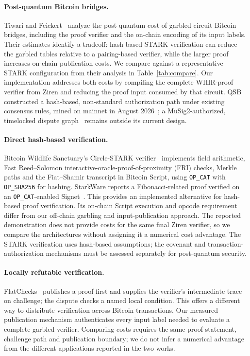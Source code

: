\documentclass[11pt]{article}
\begin{document}
\paragraph{Post-quantum Bitcoin bridges.} Tiwari and Feickert~\cite{tf26pq}
analyze the post-quantum cost of garbled-circuit Bitcoin bridges, including
the proof verifier and the on-chain encoding of its input labels. Their
estimates identify a tradeoff: hash-based STARK verification can reduce the
garbled tables relative to a pairing-based verifier, while the larger
proof increases on-chain publication costs. We compare against a
representative STARK configuration from their analysis in
Table~\ref{tab:compare}. Our implementation addresses both costs by
compiling the complete WHIR-proof verifier from Ziren and reducing the
proof input consumed by that circuit.
QSB~\cite{levy26qsb}
constructed a hash-based, non-standard authorization path under existing
consensus rules, mined on mainnet in August 2026~\cite{starkware26qsb}; a
MuSig2-authorized, timelocked dispute graph~\cite{bip327} remains outside
its current design.

\paragraph{Direct hash-based verification.} Bitcoin Wildlife Sanctuary's
Circle-STARK verifier~\cite{bitcoinwildlifecircle} implements field
arithmetic, Fast Reed--Solomon interactive-oracle-proof-of-proximity (FRI)
checks, Merkle paths and the Fiat--Shamir transcript in Bitcoin
Script, using \texttt{OP\_CAT} with \texttt{OP\_SHA256} for hashing.
StarkWare reports a Fibonacci-related proof verified on an
\texttt{OP\_CAT}-enabled Signet~\cite{starkware24computation}. This provides
an implemented alternative for hash-based proof verification. Its on-chain
Script execution and opcode requirement differ from our off-chain garbling
and input-publication approach. The reported demonstration does not provide
costs for the same final Ziren verifier, so we compare the architectures
without assigning it a numerical cost advantage. The STARK verification
uses hash-based assumptions; the covenant and transaction-authorization
mechanisms must be assessed separately for post-quantum security.

\paragraph{Locally refutable verification.} FlatChecks~\cite{lerner26flatchecks}
publishes a proof first and supplies the verifier's intermediate trace on
challenge; the dispute checks a named local condition. This offers a different
way to distribute verification across Bitcoin transactions. Our measured
publication mechanism authenticates every input label needed to evaluate a
complete garbled verifier. Comparing costs requires the same proof statement,
challenge path and publication boundary; we do not infer a numerical advantage
from the different applications reported in the two works.
\end{document}
